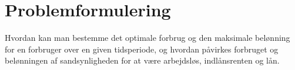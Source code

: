 \section{Problemformulering}

Hvordan kan man bestemme det optimale forbrug og den maksimale belønning for en forbruger over en given tidsperiode, og hvordan påvirkes forbruget og belønningen af sandsynligheden for at være arbejdsløs, indlånsrenten og lån. 





